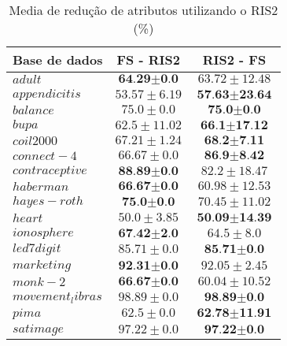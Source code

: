 \documentclass[a4paper, 12pt]{article}
\begin{document}
\begin{table}[h!]
  \begin{center}
    \caption{Media de redução de atributos utilizando o RIS2 (\%)}
    \label{tab:table6}
    \begin{tabular}{l|c|c}
      \textbf{Base de dados} &\textbf{FS - RIS2} & \textbf{RIS2 - FS}\\
        \hline
        $adult$ & $\textbf{64.29} \pm \textbf{0.0}$  & $63.72 \pm 12.48$ \\
        \hline
        $appendicitis$ & $53.57 \pm 6.19$  & $\textbf{57.63} \pm \textbf{23.64}$ \\
        \hline
        $balance$ & $75.0 \pm 0.0$  & $\textbf{75.0} \pm \textbf{0.0}$ \\
        \hline
        $bupa$ & $62.5 \pm 11.02$  & $\textbf{66.1} \pm \textbf{17.12}$ \\
        \hline
        $coil2000$ & $67.21 \pm 1.24$  & $\textbf{68.2} \pm \textbf{7.11}$ \\
        \hline
        $connect-4$ & $66.67 \pm 0.0$  & $\textbf{86.9} \pm \textbf{8.42}$ \\
        \hline
        $contraceptive$ & $\textbf{88.89} \pm \textbf{0.0}$  & $82.2 \pm 18.47$ \\
        \hline
        $haberman$ & $\textbf{66.67} \pm \textbf{0.0}$  & $60.98 \pm 12.53$ \\
        \hline
        $hayes-roth$ & $\textbf{75.0} \pm \textbf{0.0}$  & $70.45 \pm 11.02$ \\
        \hline
        $heart$ & $50.0 \pm 3.85$  & $\textbf{50.09} \pm \textbf{14.39}$ \\
        \hline
        $ionosphere$ & $\textbf{67.42} \pm \textbf{2.0}$  & $64.5 \pm 8.0$ \\
        \hline
        $led7digit$ & $85.71 \pm 0.0$  & $\textbf{85.71} \pm \textbf{0.0}$ \\
        \hline
        $marketing$ & $\textbf{92.31} \pm \textbf{0.0}$  & $92.05 \pm 2.45$ \\
        \hline
        $monk-2$ & $\textbf{66.67} \pm \textbf{0.0}$  & $60.04 \pm 10.52$ \\
        \hline
        $movement_libras$ & $98.89 \pm 0.0$  & $\textbf{98.89} \pm \textbf{0.0}$ \\
        \hline
        $pima$ & $62.5 \pm 0.0$  & $\textbf{62.78} \pm \textbf{11.91}$ \\
        \hline
        $satimage$ & $97.22 \pm 0.0$  & $\textbf{97.22} \pm \textbf{0.0}$ \\

\end{tabular}
\end{center}
\end{table}
\end{document}
